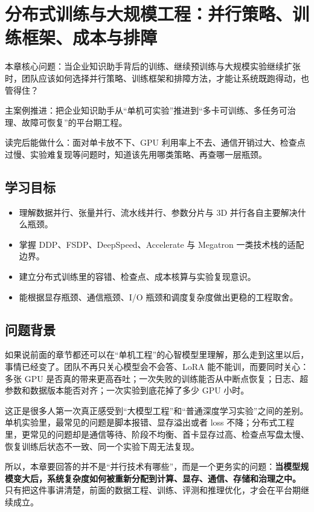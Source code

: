 \chapter{分布式训练与大规模工程：并行策略、训练框架、成本与排障}

\begin{introduction}
\item {\heiti 本章核心问题}：当企业知识助手背后的训练、继续预训练与大规模实验继续扩张时，团队应该如何选择并行策略、训练框架和排障方法，才能让系统既跑得动，也管得住？
\item {\heiti 主案例推进}：把企业知识助手从“单机可实验”推进到“多卡可训练、多任务可治理、故障可恢复”的平台期工程。
\item {\heiti 读完后能做什么}：面对单卡放不下、GPU 利用率上不去、通信开销过大、检查点过慢、实验难复现等问题时，知道该先用哪类策略、再查哪一层瓶颈。
\end{introduction}

\section{学习目标}
\begin{itemize}
  \item 理解数据并行、张量并行、流水线并行、参数分片与 3D 并行各自主要解决什么瓶颈。
  \item 掌握 DDP、FSDP、DeepSpeed、Accelerate 与 Megatron 一类技术栈的适配边界。
  \item 建立分布式训练里的容错、检查点、成本核算与实验复现意识。
  \item 能根据显存瓶颈、通信瓶颈、I/O 瓶颈和调度复杂度做出更稳的工程取舍。
\end{itemize}

\section{问题背景}
如果说前面的章节都还可以在“单机工程”的心智模型里理解，那么走到这里以后，事情已经变了。团队不再只关心模型会不会答、LoRA 能不能训，而要同时关心：多张 GPU 是否真的带来更高吞吐；一次失败的训练能否从中断点恢复；日志、超参数和数据版本能否对齐；一次实验到底花掉了多少 GPU 小时。

这正是很多人第一次真正感受到“大模型工程”和“普通深度学习实验”之间的差别。单机实验里，最常见的问题是脚本报错、显存溢出或者 loss 不降；分布式工程里，更常见的问题却是通信等待、阶段不均衡、首卡显存过高、检查点写盘太慢、恢复训练后状态不一致、同一个实验下周无法复现。

所以，本章要回答的并不是“并行技术有哪些”，而是一个更务实的问题：\textbf{当模型规模变大后，系统复杂度如何被重新分配到计算、显存、通信、存储和治理之中。} 只有把这件事讲清楚，前面的数据工程、训练、评测和推理优化，才会在平台期继续成立。

